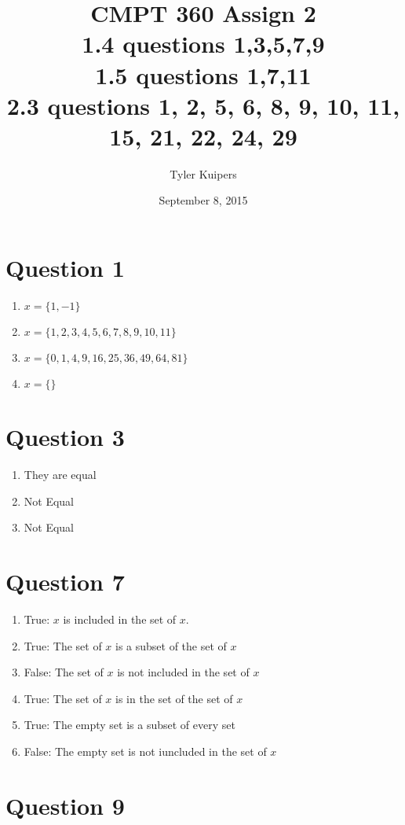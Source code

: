 \documentclass[12pt]{extarticle}
\title{CMPT 360 Assign 2 \\1.4 questions 1,3,5,7,9\\1.5 questions 1,7,11\\2.3 questions 1, 2, 5, 6, 8, 9, 10, 11, 15, 21, 22, 24, 29}
\author{Tyler Kuipers}
\date{September 8, 2015}
\begin{document}
\maketitle
\section{}
\section*{Question 1}
	\begin{enumerate}
		\item $x=\{1,-1\}$
		\item $x=\{1,2,3,4,5,6,7,8,9,10,11\}$
		\item $x=\{0,1,4,9,16,25,36,49,64,81\} $
		\item $x=\{\}$
	\end{enumerate}

\section*{Question 3}
	\begin{enumerate}
		\item They are equal
		\item Not Equal
		\item Not Equal
	\end{enumerate}

\section*{Question 7}
	\begin{enumerate}
		\item True: $x$ is included in the set of $x$.
		\item True: The set of $x$ is a subset of the set of $x$
		\item False: The set of $x$ is not included in the set of $x$
		\item True: The set of $x$ is in the set of the set of $x$
		\item True: The empty set is a subset of every set
		\item False: The empty set is not iuncluded in the set of $x$
	\end{enumerate}

\section*{Question 9}
	
\end{document}
